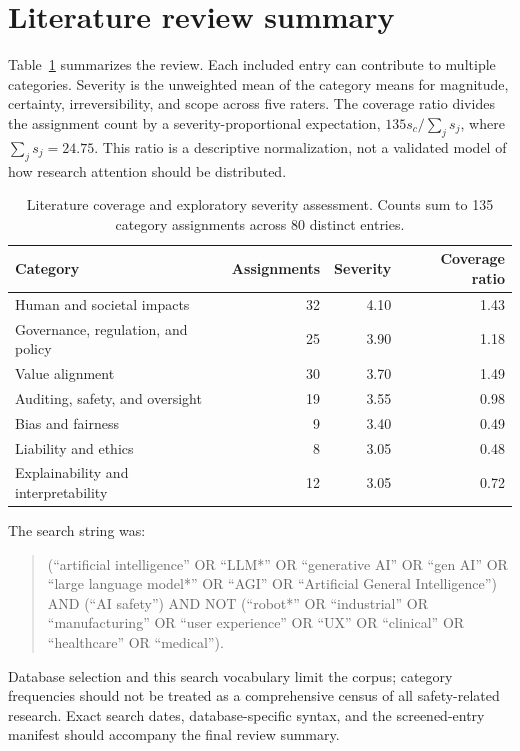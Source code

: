 \section{Literature review summary}\label{app:slr}

Table~\ref{tab:slr} summarizes the review. Each included entry can contribute to multiple categories. Severity is the unweighted mean of the category means for magnitude, certainty, irreversibility, and scope across five raters. The coverage ratio divides the assignment count by a severity-proportional expectation, $135s_c/\sum_j s_j$, where $\sum_j s_j=24.75$. This ratio is a descriptive normalization, not a validated model of how research attention should be distributed.

\begin{table}[h]
    \caption{Literature coverage and exploratory severity assessment. Counts sum to 135 category assignments across 80 distinct entries.}\label{tab:slr}
    \centering
    \begin{tabular}{lrrr}
        \toprule
        Category                            & Assignments & Severity & Coverage ratio \\
        \midrule
        Human and societal impacts          & 32          & 4.10     & 1.43           \\
        Governance, regulation, and policy  & 25          & 3.90     & 1.18           \\
        Value alignment                     & 30          & 3.70     & 1.49           \\
        Auditing, safety, and oversight     & 19          & 3.55     & 0.98           \\
        Bias and fairness                   & 9           & 3.40     & 0.49           \\
        Liability and ethics                & 8           & 3.05     & 0.48           \\
        Explainability and interpretability & 12          & 3.05     & 0.72           \\
        \bottomrule
    \end{tabular}
\end{table}

The search string was:
\begin{quote}
    (``artificial intelligence'' OR ``LLM*'' OR ``generative AI'' OR ``gen AI'' OR ``large language model*'' OR ``AGI'' OR ``Artificial General Intelligence'') AND (``AI safety'') AND NOT (``robot*'' OR ``industrial'' OR ``manufacturing'' OR ``user experience'' OR ``UX'' OR ``clinical'' OR ``healthcare'' OR ``medical'').
\end{quote}
Database selection and this search vocabulary limit the corpus; category frequencies should not be treated as a comprehensive census of all safety-related research. Exact search dates, database-specific syntax, and the screened-entry manifest should accompany the final review summary.

